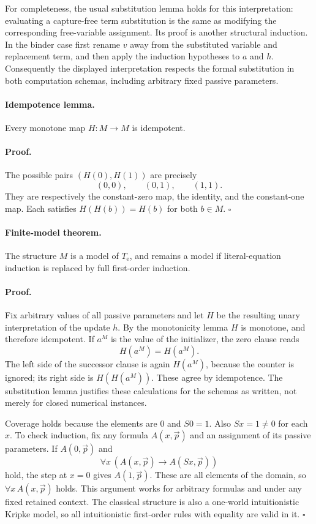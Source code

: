 \documentclass[11pt,letterpaper]{article}
\theoremstyle{definition}\newtheorem{definition}[theorem]{Definition}
\theoremstyle{remark}\newtheorem{remark}[theorem]{Remark}
\begin{document}
For completeness, the usual substitution lemma holds for this
interpretation: evaluating a capture-free term substitution is the same
as modifying the corresponding free-variable assignment.  Its proof is
another structural induction.  In the binder case first rename $v$ away
from the substituted variable and replacement term, and then apply the
induction hypotheses to $a$ and $h$.  Consequently the displayed
interpretation respects the formal substitution in both computation
schemas, including arbitrary fixed passive parameters.

\paragraph{Idempotence lemma.}
Every monotone map $H:M\to M$ is idempotent.

\paragraph{Proof.}
The possible pairs $(H(0),H(1))$ are precisely
\[
                       (0,0),\qquad(0,1),\qquad(1,1).
\]
They are respectively the constant-zero map, the identity, and the
constant-one map.  Each satisfies $H(H(b))=H(b)$ for both $b\in M$.
\hfill$\square$

\paragraph{Finite-model theorem.}
The structure $M$ is a model of $T_{\mathrm e}$, and remains a model if
literal-equation induction is replaced by full first-order induction.

\paragraph{Proof.}
Fix arbitrary values of all passive parameters and let $H$ be the
resulting unary interpretation of the update $h$.  By the monotonicity
lemma $H$ is monotone, and therefore idempotent.  If $a^M$ is the value of
the initializer, the zero clause reads
\[
                         H(a^M)=H(a^M).
\]
The left side of the successor clause is again $H(a^M)$, because the
counter is ignored; its right side is $H(H(a^M))$.  These agree by
idempotence.  The substitution lemma justifies these calculations for
the schemas as written, not merely for closed numerical instances.

Coverage holds because the elements are $0$ and $S0=1$.  Also $Sx=1\ne0$
for each $x$.  To check induction, fix any formula $A(x,\vec p)$ and an
assignment of its passive parameters.  If $A(0,\vec p)$ and
\[
             \forall x\,(A(x,\vec p)\to A(Sx,\vec p))
\]
hold, the step at $x=0$ gives $A(1,\vec p)$.  These are all elements of
the domain, so $\forall x\,A(x,\vec p)$ holds.  This argument works for
arbitrary formulas and under any fixed retained context.  The classical
structure is also a one-world intuitionistic Kripke model, so all
intuitionistic first-order rules with equality are valid in it.
\hfill$\square$
\end{document}
